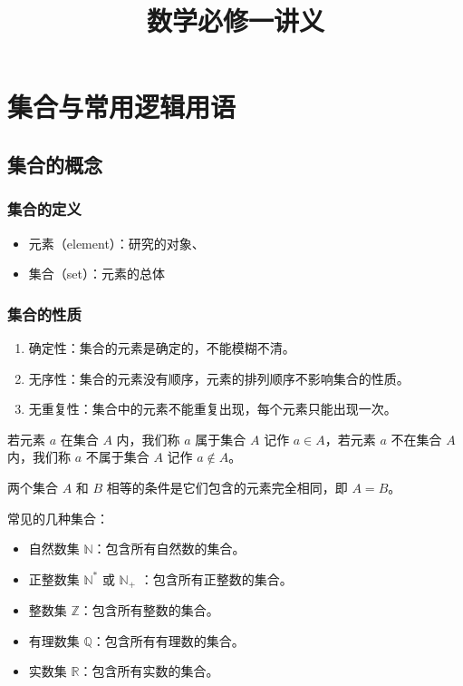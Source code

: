\documentclass[lang = zh , final , oneside , openany , titlepage , zihao = -4 , linespread = 1.3 , baselineskip = false , cjk-font = windows , text-font = newtx , math-font = newtx]{sjtureport}
\title{数学必修一讲义}
\begin{document}
\maketitle

\setcounter{page}{1}  %
\pagestyle{plain}     %
\tableofcontents


\newpage
\setcounter{page}{1}  %
\pagestyle{plain}     %
\chapter{集合与常用逻辑用语}
\section{集合的概念}
\subsection{集合的定义}

\begin{itemize}
    \item 元素（element）：研究的对象、
    \item 集合（set）：元素的总体
\end{itemize}

\subsection{集合的性质}

\begin{enumerate}
    \item 确定性：集合的元素是确定的，不能模糊不清。
    \item 无序性：集合的元素没有顺序，元素的排列顺序不影响集合的性质。
    \item 无重复性：集合中的元素不能重复出现，每个元素只能出现一次。
\end{enumerate}

若元素 $a$ 在集合 $A$ 内，我们称 $a$ 属于集合 $A$ 记作 $a \in A$，若元素 $a$ 不在集合 $A$ 内，我们称 $a$ 不属于集合 $A$ 记作 $a \notin A$。

两个集合 $A$ 和 $B$ 相等的条件是它们包含的元素完全相同，即 $A = B$。

\begin{remark}
    常见的几种集合：
    \begin{itemize}
        \item 自然数集 $\mathbb{N}$：包含所有自然数的集合。
        \item 正整数集 $\mathbb{N}^*$ 或 $\mathbb{N}_+$ ：包含所有正整数的集合。
        \item 整数集 $\mathbb{Z}$：包含所有整数的集合。
        \item 有理数集 $\mathbb{Q}$：包含所有有理数的集合。
        \item 实数集 $\mathbb{R}$：包含所有实数的集合。
    \end{itemize}
\end{remark}
\end{document}
